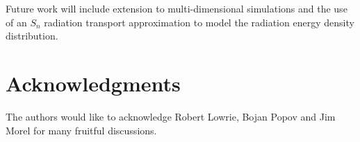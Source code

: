 \documentclass[times,doublespace]{fldauth}%
\begin{document}
%
Future work will include extension to multi-dimensional simulations and the use of an $S_n$ radiation transport approximation to model the radiation energy density distribution.

\section*{Acknowledgments}
The authors would like to acknowledge Robert Lowrie, Bojan Popov and Jim Morel for many fruitful discussions.

\appendix



\end{document}

